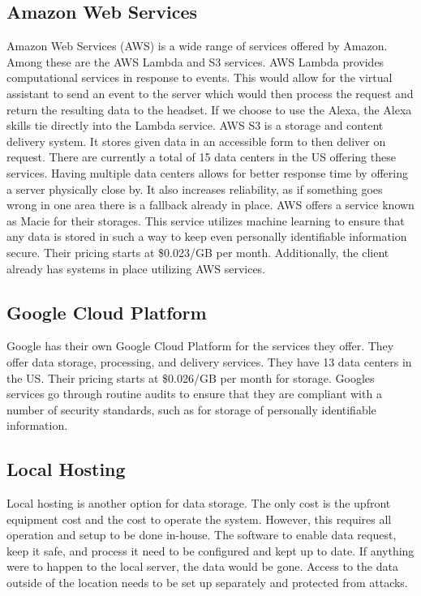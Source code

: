 \documentclass[letterpaper,10pt,onecolumn]{IEEEtran}
\begin{document}
  \subsection {Amazon Web Services}
    Amazon Web Services (AWS) is a wide range of services offered by Amazon. Among these are the AWS Lambda and S3 services. AWS Lambda provides computational services in response to events. This would allow for the virtual assistant to send an event to the server which would then process the request and return the resulting data to the headset. If we choose to use the Alexa, the Alexa skills tie directly into the Lambda service. AWS S3 is a storage and content delivery system. It stores given data in an accessible form to then deliver on request. There are currently a total of 15 data centers in the US offering these services. Having multiple data centers allows for better response time by offering a server physically close by. It also increases reliability, as if something goes wrong in one area there is a fallback already in place. AWS offers a service known as Macie for their storages. This service utilizes machine learning to ensure that any data is stored in such a way to  keep even personally identifiable information secure. Their pricing starts at \$0.023/GB per month. Additionally, the client already has systems in place utilizing AWS services. \cite{aws}

  \subsection {Google Cloud Platform}
    Google has their own Google Cloud Platform for the services they offer. They offer data storage, processing, and delivery services. They have 13 data centers in the US. Their pricing starts at \$0.026/GB per month for storage. Google\textsc\textquotesingle s services go through routine audits to ensure that they are compliant with a number of security standards, such as for storage of personally identifiable information. \cite{gcp}

  \subsection {Local Hosting}
    Local hosting is another option for data storage. The only cost is the upfront equipment cost and the cost to operate the system. However, this requires all operation and setup to be done in-house. The software to enable data request, keep it safe, and process it need to be configured and kept up to date. If anything were to happen to the local server, the data would be gone. Access to the data outside of the location needs to be set up separately and protected from attacks.
\end{document}
